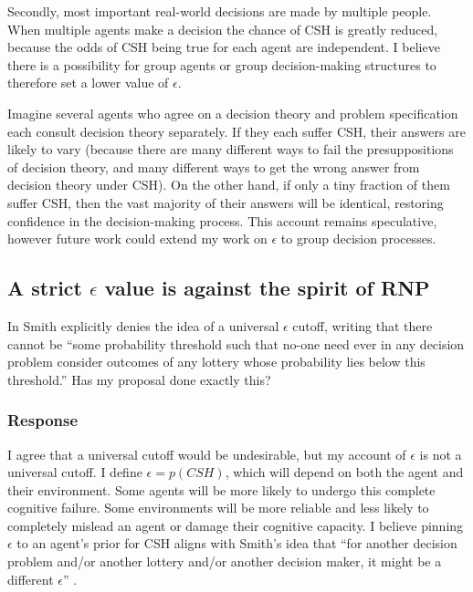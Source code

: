 \documentclass{article}
\begin{document}
Secondly, most important real-world decisions are made by multiple people. When multiple agents make a decision the chance of CSH is greatly reduced, because the odds of CSH being true for each agent are independent. I believe there is a possibility for group agents or group decision-making structures to therefore set a lower value of \(\epsilon\). 

Imagine several agents who agree on a decision theory and problem specification each consult decision theory separately. If they each suffer CSH, their answers are likely to vary (because there are many different ways to fail the presuppositions of decision theory, and many different ways to get the wrong answer from decision theory under CSH). On the other hand, if only a tiny fraction of them suffer CSH, then the vast majority of their answers will be identical, restoring confidence in the decision-making process. This account remains speculative, however future work could extend my work on \(\epsilon\) to group decision processes.

\subsection{A strict \(\epsilon\) value is against the spirit of RNP}

In \citep[pg. 476]{smith2014evaluative} Smith explicitly denies the idea of a universal \(\epsilon\) cutoff, writing that there cannot be ``some probability threshold such that no-one need ever \textemdash{} in any decision problem \textemdash{} consider outcomes \textemdash{} of any lottery \textemdash{} whose probability lies below this threshold.'' Has my proposal done exactly this?

\subsubsection*{Response}

I agree that a universal cutoff would be undesirable, but my account of \(\epsilon\) is not a universal cutoff. I define \(\epsilon = p(CSH)\), which will depend on both the agent and their environment. Some agents will be more likely to undergo this complete cognitive failure. Some environments will be more reliable and less likely to completely mislead an agent or damage their cognitive capacity. I believe pinning \(\epsilon\) to an agent's prior for CSH aligns with Smith's idea that ``for another decision problem and/or another lottery and/or another decision maker, it might be a different \(\epsilon\)'' \citep[pg. 472]{smith2014evaluative}.
\end{document}
